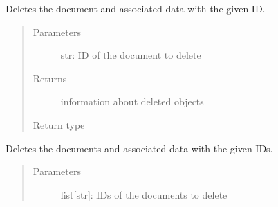 \documentclass[letterpaper,10pt,english]{sphinxmanual}
\begin{document}
\begin{fulllineitems}
\begin{fulllineitems}
\label{\detokenize{autoapi/pine/client/index:pine.client.PineClient.delete_document}}
\sphinxAtStartPar
Deletes the document and associated data with the given ID.
\begin{quote}\begin{description}
\item[{Parameters}] \leavevmode
\sphinxAtStartPar
{} \textendash{} str: ID of the document to delete

\item[{Returns}] \leavevmode
\sphinxAtStartPar
information about deleted objects

\item[{Return type}] \leavevmode
\sphinxAtStartPar
{}

\end{description}\end{quote}

\end{fulllineitems}


\begin{fulllineitems}
\label{\detokenize{autoapi/pine/client/index:pine.client.PineClient.delete_documents}}
\sphinxAtStartPar
Deletes the documents and associated data with the given IDs.
\begin{quote}\begin{description}
\item[{Parameters}] \leavevmode
\sphinxAtStartPar
{} \textendash{} list{[}str{]}: IDs of the documents to delete


\end{description}
\end{quote}
\end{fulllineitems}
\end{fulllineitems}
\end{document}

